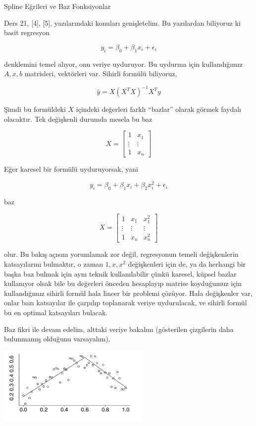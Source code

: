 \documentclass[12pt,fleqn]{article}\usepackage{../../common}
\begin{document}
Spline Eğrileri ve Baz Fonksiyonlar

Ders 21, [4], [5], yazılarındaki konuları genişletelim. Bu yazılardan
biliyoruz ki basit regresyon

$$ y_i = \beta_0 + \beta_1 x_i + \epsilon_i$$

denklemini temel alıyor, onu veriye uyduruyor. Bu uydurma için
kullandığımız $A,x,b$ matrisleri, vektörleri var. Sihirli formülü
biliyoruz, 

$$ \hat{y} = X(X^TX)^{-1}X^Ty $$

Şimdi bu formüldeki $X$ içindeki değerleri farklı ``bazlar'' olarak görmek
faydalı olacaktır. Tek değişkenli durumda mesela bu baz

$$ X = 
\left[\begin{array}{cc}
1 & x_1 \\ \vdots & \vdots \\ 1 & x_n
\end{array}\right]
$$

Eğer karesel bir formülü uyduruyorsak, yani

$$ y_i = \beta_0 + \beta_1x_i + \beta_2x_i^2 + \epsilon_i $$

baz 

$$ X = 
\left[\begin{array}{ccc}
1 & x_1 & x_1^2\\ 
\vdots & \vdots & \vdots \\
1 & x_n & x_n^2
\end{array}\right]
$$

olur. Bu bakış açısını yorumlamak zor değil, regresyonun temeli
değişkenlerin katsayılarını bulmaktır, o zaman $1,x,x^2$ değişkenleri için
de, ya da herhangi bir başka baz bulmak için aynı teknik kullanılabilir
çünkü karesel, küpsel bazlar kullanıyor olsak bile bu değerleri önceden
hesaplayıp matrise koyduğumuz için kullandığımız sihirli formül hala lineer
bir problemi çözüyor. Hala değişkenler var, onlar bazı katsayılar ile
çarpılıp toplanarak veriye uydurulacak, ve sihirli formül bu en optimal
katsayıları bulacak.

Baz fikri ile devam edelim, alttaki veriye bakalım (gösterilen çizgilerin
daha bulunmamış olduğunu varsayalım),

\includegraphics[width=20em]{compscieng_app20_04.png}
\end{document}
